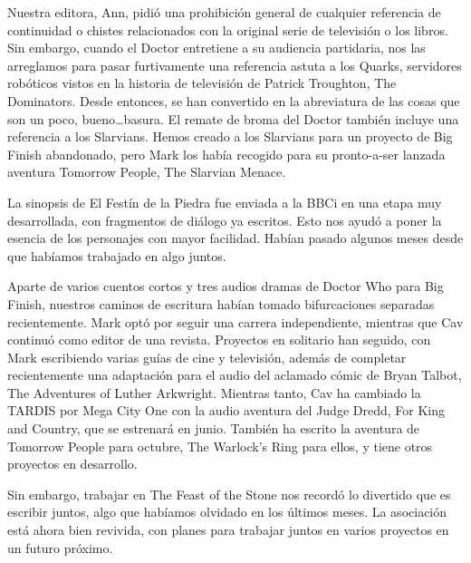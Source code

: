 {Nuestra editora, Ann, pidió una prohibición general de cualquier referencia
 de continuidad o chistes relacionados con la original serie de televisión o los
 libros. Sin embargo, cuando el Doctor entretiene a su audiencia partidaria,
 nos las arreglamos para pasar furtivamente una referencia astuta a los
 Quarks, servidores robóticos vistos en la historia de televisión de Patrick
 Troughton, The Dominators. Desde entonces, se han convertido en la
 abreviatura de las cosas que son un poco, bueno\ldots basura. El remate de
 broma del Doctor también incluye una referencia a los Slarvians. Hemos
 creado a los Slarvians para un proyecto de Big Finish abandonado, pero
 Mark los había recogido para su pronto-a-ser lanzada aventura Tomorrow
People, The Slarvian Menace.}

{La sinopsis de El Festín de la Piedra fue enviada a la BBCi en una etapa muy
 desarrollada, con fragmentos de diálogo ya escritos. Esto nos ayudó a poner
 la esencia de los personajes con mayor facilidad. Habían pasado algunos meses
desde que habíamos trabajado en algo juntos.}

{Aparte de varios cuentos cortos y tres audios dramas de Doctor Who para Big
 Finish, nuestros caminos de escritura habían tomado bifurcaciones separadas
 recientemente. Mark optó por seguir una carrera independiente, mientras que
 Cav continuó como editor de una revista. Proyectos en solitario han seguido,
 con Mark escribiendo varias guías de cine y televisión, además de completar
 recientemente una adaptación para el audio del aclamado cómic de Bryan
 Talbot, The Adventures of Luther Arkwright. Mientras tanto, Cav ha cambiado
 la TARDIS por Mega City One con la audio aventura del Judge Dredd, For
 King and Country, que se estrenará en junio. También ha escrito la aventura
 de Tomorrow People para octubre, The Warlock's Ring para ellos, y tiene otros
proyectos en desarrollo.}

{Sin embargo, trabajar en The Feast of the Stone nos recordó lo divertido
 que es escribir juntos, algo que habíamos olvidado en los últimos meses. La
 asociación está ahora bien revivida, con planes para trabajar juntos en varios
proyectos en un futuro próximo.}
